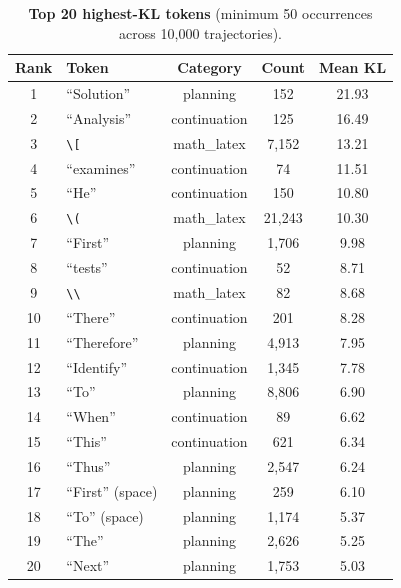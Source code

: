 \documentclass[10pt]{article}
\begin{document}
\begin{table}[!htbp]
\centering
\caption{\textbf{Top 20 highest-KL tokens} (minimum 50 occurrences across 10,000 trajectories).}
\label{tab:app_high_kl_tokens}
\small
\begin{tabular}{clccc}
\toprule
\textbf{Rank} & \textbf{Token} & \textbf{Category} & \textbf{Count} & \textbf{Mean KL} \\
\midrule
1 & ``Solution'' & planning & 152 & 21.93 \\
2 & ``Analysis'' & continuation & 125 & 16.49 \\
3 & \texttt{\textbackslash[} & math\_latex & 7,152 & 13.21 \\
4 & ``examines'' & continuation & 74 & 11.51 \\
5 & ``He'' & continuation & 150 & 10.80 \\
6 & \texttt{\textbackslash(} & math\_latex & 21,243 & 10.30 \\
7 & ``First'' & planning & 1,706 & 9.98 \\
8 & ``tests'' & continuation & 52 & 8.71 \\
9 & \texttt{\textbackslash\textbackslash} & math\_latex & 82 & 8.68 \\
10 & ``There'' & continuation & 201 & 8.28 \\
11 & ``Therefore'' & planning & 4,913 & 7.95 \\
12 & ``Identify'' & continuation & 1,345 & 7.78 \\
13 & ``To'' & planning & 8,806 & 6.90 \\
14 & ``When'' & continuation & 89 & 6.62 \\
15 & ``This'' & continuation & 621 & 6.34 \\
16 & ``Thus'' & planning & 2,547 & 6.24 \\
17 & ``First'' (space) & planning & 259 & 6.10 \\
18 & ``To'' (space) & planning & 1,174 & 5.37 \\
19 & ``The'' & planning & 2,626 & 5.25 \\
20 & ``Next'' & planning & 1,753 & 5.03 \\
\bottomrule
\end{tabular}
\end{table}
\end{document}
